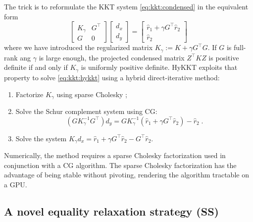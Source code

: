 The trick is to reformulate the KKT system \eqref{eq:kkt:condensed}
in the equivalent form
\begin{equation}
  \label{eq:kkt:hykkt}
  \begin{bmatrix}
    K_\gamma & G^\top \\
    G & 0
  \end{bmatrix}
  \begin{bmatrix}
    d_x \\ d_y
  \end{bmatrix}
  =
  \begin{bmatrix}
    \hat{r}_1 + \gamma G^\top \hat{r}_2 \\
    \hat{r}_2
  \end{bmatrix}
\end{equation}
where we have introduced the regularized matrix $K_\gamma := K + \gamma G^\top G$.
If $G$ is full-rank ang $\gamma$ is large enough, the projected condensed matrix $Z^\top K Z$
is positive definite if and only if $K_\gamma$ is uniformly positive definite.
HyKKT exploits that property to solve \eqref{eq:kkt:hykkt} using a hybrid
direct-iterative method:
\begin{enumerate}
  \item Factorize $K_\gamma$ using sparse Cholesky ;
  \item Solve the Schur complement system using CG:
    \begin{equation}
      (G K_\gamma^{-1} G^\top) d_y = G K_\gamma^{-1} (\hat{r}_1 + \gamma G^\top \hat{r}_2) - \hat{r}_2 \; .
    \end{equation}
  \item Solve the system $K_\gamma d_x = \hat{r}_1 + \gamma G^\top \hat{r}_2 - G^\top \hat{r}_2$.
\end{enumerate}
Numerically, the method requires a sparse Cholesky factorization used
in conjunction with a CG algorithm. The sparse Cholesky factorization
has the advantage of being stable without pivoting, rendering the algorithm
tractable on a GPU.

\subsection{A novel equality relaxation strategy (SS)}
